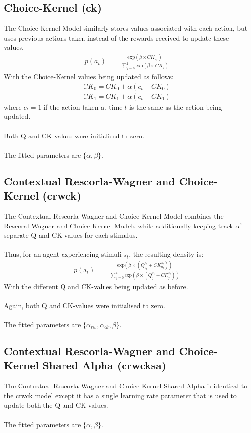 \documentclass[12pt]{article}
\begin{document}
\subsection{Choice-Kernel (ck)}
The Choice-Kernel Model similarly stores values associated with each action, but uses previous actions taken instead of the rewards received to update these values.
\begin{align}
	p(a_t) &= \frac{\text{exp}\left(\beta \times CK_{a_t}\right)}{\sum_{j=0}^1 \text{exp}\left(\beta \times CK_j\right)}
\end{align}
With the Choice-Kernel values being updated as follows:
\begin{align}
	CK_0 = CK_0 + \alpha(c_t - CK_0)\\
	CK_1 = CK_1 + \alpha(c_t - CK_1)
\end{align}
where $c_t = 1$ if the action taken at time $t$ is the same as the action being updated.
\\\\
Both Q and CK-values were initialised to zero.
\\\\
The fitted parameters are $\{\alpha, \beta\}$.

\subsection{Contextual Rescorla-Wagner and Choice-Kernel (crwck)}
The Contextual Rescorla-Wagner and Choice-Kernel Model combines the Rescoral-Wagner and Choice-Kernel Models while additionally keeping track of separate Q and CK-values for each stimulus.\\\\
Thus, for an agent experiencing stimuli $s_t$, the resulting density is:
\begin{align}
	p(a_t) &= \frac{\text{exp}\left(\beta \times \left(Q^{s_t}_{a_t} + CK^{s_t}_{a_t}\right)\right)}{\sum_{j=0}^1 \text{exp}\left(\beta \times \left( Q^{s_t}_{j} +  CK^{s_t}_{j}\right)\right)}
\end{align}
With the different Q and CK-values being updated as before.\\\\
Again, both Q and CK-values were initialised to zero.\\\\
The fitted parameters are $\{\alpha_{rw}, \alpha_{ck}, \beta\}$.

\subsection{Contextual Rescorla-Wagner and Choice-Kernel Shared Alpha (crwcksa)}
The Contextual Rescorla-Wagner and Choice-Kernel Shared Alpha is identical to the crwck model except it has a single learning rate parameter that is used to update both the Q and CK-values.
\\\\
The fitted parameters are $\{\alpha, \beta\}$.
\end{document}
